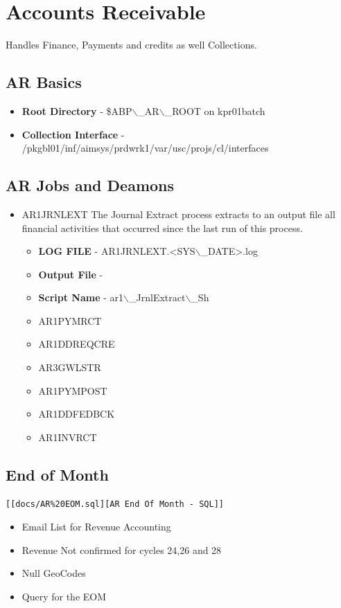\documentclass[12pt,twoside]{article}
\begin{document}
\section{Accounts Receivable}
\label{sec:orgheadline36}
Handles Finance, Payments and credits as well Collections.
\subsection{AR Basics}
\label{sec:orgheadline28}
\begin{itemize}
\item \textbf{Root Directory} - \$ABP$\backslash$\_AR$\backslash$\_ROOT on kpr01batch
\item \textbf{Collection Interface} -
/pkgbl01/inf/aimsys/prdwrk1/var/usc/projs/cl/interfaces
\end{itemize}

\subsection{AR Jobs and Deamons}
\label{sec:orgheadline29}
\begin{itemize}
\item AR1JRNLEXT
The Journal Extract process extracts to an output file all
     financial activities that occurred since the last run of
     this process.
\begin{itemize}
\item \textbf{LOG FILE} - AR1JRNLEXT.<SYS$\backslash$\_DATE>.log
\item \textbf{Output File} -
\item \textbf{Script Name} - ar1$\backslash$\_JrnlExtract$\backslash$\_Sh
\end{itemize}
\begin{itemize}
\item AR1PYMRCT
\item AR1DDREQCRE
\item AR3GWLSTR
\item AR1PYMPOST
\item AR1DDFEDBCK
\item AR1INVRCT
\end{itemize}
\end{itemize}
\subsection{End of Month}
\label{sec:orgheadline30}
\begin{verbatim}
[[docs/AR%20EOM.sql][AR End Of Month - SQL]]
\end{verbatim}
\begin{itemize}
\item Email List for Revenue Accounting
\item Revenue Not confirmed for cycles 24,26 and 28
\item Null GeoCodes
\item Query for the EOM
\end{itemize}
\end{document}
